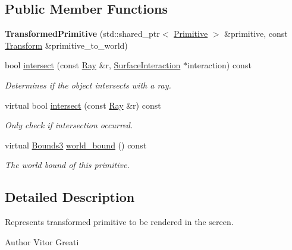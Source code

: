 \subsection*{Public Member Functions}
\begin{DoxyCompactItemize}
\item 
\mbox{\label{classomg_1_1_transformed_primitive_ae3b897fd51fb7cff84d73bbe8168b068}} 
{\bfseries Transformed\+Primitive} (std\+::shared\+\_\+ptr$<$ \mbox{\hyperlink{classomg_1_1_primitive}{Primitive}} $>$ \&primitive, const \mbox{\hyperlink{classomg_1_1_transform}{Transform}} \&primitive\+\_\+to\+\_\+world)
\item 
bool \mbox{\hyperlink{classomg_1_1_transformed_primitive_ab2ec675cf03eb5b8e59679c737e12ec4}{intersect}} (const \mbox{\hyperlink{classomg_1_1_ray}{Ray}} \&r, \mbox{\hyperlink{classomg_1_1_surface_interaction}{Surface\+Interaction}} $\ast$interaction) const
\begin{DoxyCompactList}\small\item\em Determines if the object intersects with a ray. \end{DoxyCompactList}\item 
virtual bool \mbox{\hyperlink{classomg_1_1_transformed_primitive_a74303debd3737dd5d73de33507e36ecf}{intersect}} (const \mbox{\hyperlink{classomg_1_1_ray}{Ray}} \&r) const
\begin{DoxyCompactList}\small\item\em Only check if intersection occurred. \end{DoxyCompactList}\item 
virtual \mbox{\hyperlink{classomg_1_1_bounds3}{Bounds3}} \mbox{\hyperlink{classomg_1_1_transformed_primitive_a5478871a0d44380d5e64301746d6774b}{world\+\_\+bound}} () const
\begin{DoxyCompactList}\small\item\em The world bound of this primitive. \end{DoxyCompactList}\end{DoxyCompactItemize}


\subsection{Detailed Description}
Represents transformed primitive to be rendered in the screen. 

\begin{DoxyAuthor}{Author}
Vitor Greati 
\end{DoxyAuthor}


